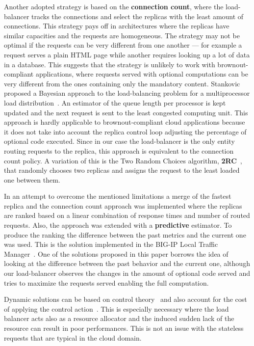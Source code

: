 Another adopted strategy is based on the \textbf{connection count},
where the load-balancer tracks the connections and select the replicas
with the least amount of connections. This strategy pays off in
architectures where the replicas have similar capacities and the
requests are homogeneous. The strategy may not be optimal if the
requests can be very different from one another --- for example a
request serves a plain HTML page while another requires looking up a
lot of data in a database. This suggests that the strategy is unlikely
to work with brownout-compliant applications, where requests served
with optional computations can be very different from the ones
containing only the mandatory content. Stankovic proposed a Bayesian
approach to the load-balancing problem for a multiprocessor load
distribution~\cite{Stankovic:TC}. An estimator of the queue length per
processor is kept updated and the next request is sent to the least
congested computing unit. This approach is hardly applicable to
brownout-compliant cloud applications because it does not take into
account the replica control loop adjusting the percentage of optional
code executed. Since in our case the load-balancer is the only entity
routing requests to the replica, this approach is equivalent to the
connection count policy. A variation of this is the Two Random Choices
algorithm, \textbf{2RC}~\cite{2RC}, that randomly chooses two replicas
and assigns the request to the least loaded one between them.

In an attempt to overcome the mentioned limitations a merge of the
fastest replica and the connection count approach was implemented
where the replicas are ranked based on a linear combination of
response times and number of routed requests. Also, the approach was
extended with a \textbf{predictive} estimator. To produce the ranking
the difference between the past metrics and the current one was
used. This is the solution implemented in the BIG-IP Local Traffic
Manager~\cite{BIGIP}. One of the solutions proposed in this paper
borrows the idea of looking at the difference between the past
behavior and the current one, although our load-balancer observes the
changes in the amount of optional code served and tries to maximize
the requests served enabling the full computation.

Dynamic solutions can be based on control
theory~\cite{multipathctlb,comparisonstaticdynamic} and also account
for the cost of applying the control action~\cite{costofcontrol}. This
is especially necessary where the load balancer acts also as a
resource allocator and the induced sudden lack of the resource can
result in poor performances. This is not an issue with the stateless
requests that are typical in the cloud domain.

